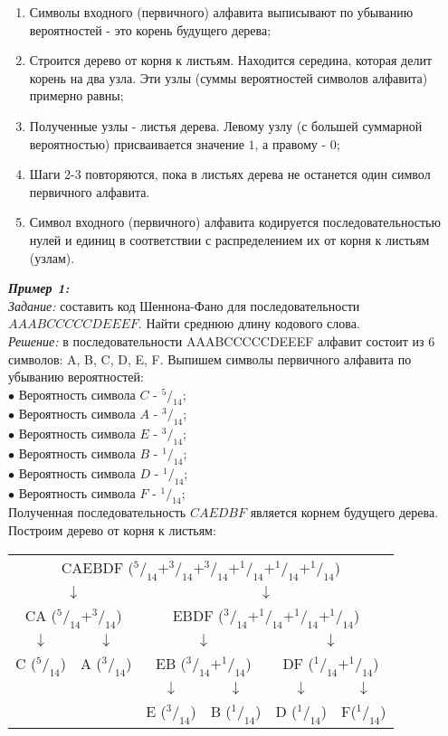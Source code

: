 \begin{enumerate}
\item Символы входного (первичного) алфавита выписывают по убыванию вероятностей - это корень будущего дерева;
\item Строится дерево от корня к листьям. Находится середина, которая делит корень на два узла. Эти узлы (суммы вероятностей символов алфавита) примерно равны;
\item Полученные узлы - листья дерева. Левому узлу (с большей суммарной вероятностью) присваивается значение $1$, а правому - $0$;
\item Шаги 2-3 повторяются, пока в листьях дерева не останется один символ первичного алфавита.
\item Символ входного (первичного) алфавита кодируется последовательностью нулей и единиц в соответствии с распределением их от корня к листьям (узлам).
\end{enumerate}
\emph{\textbf{Пример 1:}}
\\\emph{Задание:} составить код Шеннона-Фано для последовательности
\\$AAABCCCCCDEEEF$. Найти среднюю длину кодового слова.
\\\emph{Решение:} в последовательности AAABCCCCCDEEEF алфавит состоит из 6 символов: A, B, C, D, E, F. Выпишем символы первичного алфавита по убыванию вероятностей:
\\$\bullet$ Вероятность символа $C$ - $^5/_{14}$;
\\$\bullet$ Вероятность символа $A$ - $^3/_{14}$;
\\$\bullet$ Вероятность символа $E$ - $^3/_{14}$;
\\$\bullet$ Вероятность символа $B$ - $^1/_{14}$;
\\$\bullet$ Вероятность символа $D$ - $^1/_{14}$;
\\$\bullet$ Вероятность символа $F$ - $^1/_{14}$;
\\Полученная последовательность $CAEDBF$ является корнем будущего дерева.
\\Построим дерево от корня к листьям:
\begin{table}[h]
\centering
\begin{tabular}{c c c c c c}
\multicolumn{6}{c}{CAEBDF ($^5/_{14} + ^3/_{14} + ^3/_{14} + ^1/_{14} + ^1/_{14} + ^1/_{14}$)} \\
\multicolumn{2}{c}{$\downarrow$} & \multicolumn{4}{c}{$\downarrow$} \\
\multicolumn{2}{c}{CA ($^5/_{14} + ^3/_{14}$)} & \multicolumn{4}{c}{EBDF ($^3/_{14} + ^1/_{14} + ^1/_{14} + ^1/_{14}$)} \\
$\downarrow$ & $\downarrow$ & \multicolumn{2}{c}{$\downarrow$} & \multicolumn{2}{c}{$\downarrow$} \\
C ($^5/_{14}$) & A ($^3/_{14}$) & \multicolumn{2}{c}{EB ($^3/_{14} + ^1/_{14}$)} & \multicolumn{2}{c}{DF ($^1/_{14} + ^1/_{14}$)} \\
 & & $\downarrow$ & $\downarrow$ & $\downarrow$ & $\downarrow$ \\
 & & E ($^3/_{14}$) & B ($^1/_{14}$) & D ($^1/_{14}$) & F($^1/_{14}$) \\
\end{tabular}
\end{table}
